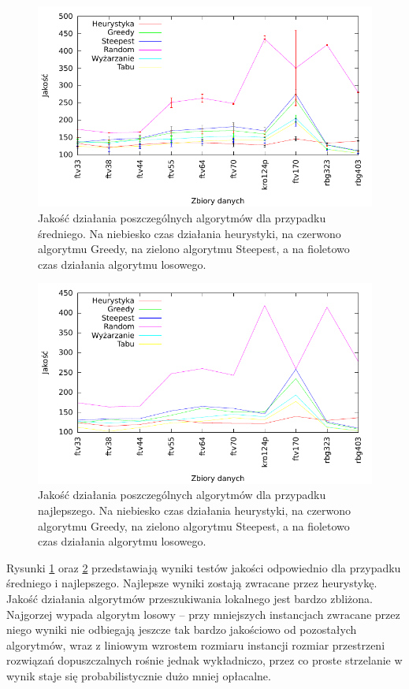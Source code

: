 \begin{figure}[!h]
\centering\includegraphics[width=12cm]{img/jakosc_avg}
\caption{Jakość działania poszczególnych algorytmów dla przypadku średniego. Na niebiesko czas działania heurystyki, na czerwono algorytmu Greedy, na zielono algorytmu Steepest, a na fioletowo czas działania algorytmu losowego.}\label{rys:jakosc_avg}
\end{figure}

\begin{figure}[!h]
\centering\includegraphics[width=12cm]{img/jakosc_best}
\caption{Jakość działania poszczególnych algorytmów dla przypadku najlepszego. Na niebiesko czas działania heurystyki, na czerwono algorytmu Greedy, na zielono algorytmu Steepest, a na fioletowo czas działania algorytmu losowego.}\label{rys:jakosc_best}
\end{figure}

Rysunki \ref{rys:jakosc_avg} oraz \ref{rys:jakosc_best} przedstawiają wyniki testów jakości odpowiednio dla przypadku średniego i najlepszego. Najlepsze wyniki zostają zwracane przez heurystykę. Jakość działania algorytmów przeszukiwania lokalnego jest bardzo zbliżona. Najgorzej wypada algorytm losowy -- przy mniejszych instancjach zwracane przez niego wyniki nie odbiegają jeszcze tak bardzo jakościowo od pozostałych algorytmów, wraz z liniowym wzrostem rozmiaru instancji rozmiar przestrzeni rozwiązań dopuszczalnych rośnie jednak wykładniczo, przez co proste strzelanie w wynik staje się probabilistycznie dużo mniej opłacalne.

